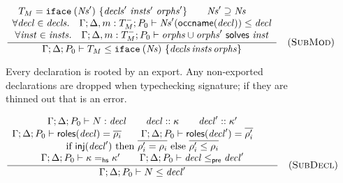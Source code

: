 \begin{figure}


\[
\frac{
\begin{array}{c}
T_M = \texttt{iface}\:(\mathit{Ns}')~\{\mathit{decls}'~\mathit{insts}'~\mathit{orphs}'\} \qquad
\mathit{Ns}' \supseteq \mathit{Ns} \qquad \\
\forall \mathit{decl} \in \mathit{decls}.\quad \Gamma; \Delta, m : T_M^-; P_0 \vdash \mathit{Ns}'(\textsf{occname}(\mathit{decl})) \le \mathit{decl} \\
\forall \mathit{inst} \in \mathit{insts}.\quad \Gamma; \Delta, m : T_M^-; P_0 \vdash \mathit{orphs} \cup \mathit{orphs}' ~\textsf{solves}~ \mathit{inst}
\end{array}
}{
\Gamma; \Delta; P_0 \vdash T_M \le \texttt{iface}\:(\mathit{Ns})~\{\mathit{decls}\, \mathit{insts}\, \mathit{orphs}\}
}
\quad(\textsc{SubMod})
\]

\caption{
Every declaration is rooted by an export.  Any non-exported declarations are dropped when typechecking signature; if they are thinned out that is an error.
}
\label{typing:top-subtyping}


\end{figure}


\begin{figure}


\[
\frac{
\begin{array}{c}
\Gamma; \Delta; P_0 \vdash N : \mathit{decl} \qquad
\mathit{decl} :: \kappa \qquad
\mathit{decl}' :: \kappa' \\
\Gamma; \Delta; P_0 \vdash \textsf{roles}(\mathit{decl}) = \overline{\rho_i} \qquad
\Gamma; \Delta; P_0 \vdash \textsf{roles}(\mathit{decl}') = \overline{\rho'_i} \qquad
\\
\textrm{if}~\textsf{inj}(\mathit{decl}')
    ~\textrm{then}~ \overline{\rho'_i = \rho_i}
    ~\textrm{else}~ \overline{\rho'_i \le \rho_i} \\
\Gamma; \Delta; P_0 \vdash \kappa =_\mathsf{hs} \kappa' \qquad
\Gamma; \Delta; P_0 \vdash \mathit{decl} \le_\textsf{pre} \mathit{decl}'
\end{array}
}{
\Gamma; \Delta; P_0 \vdash N \le \mathit{decl}'
}
\quad(\textsc{SubDecl})
\]
\end{figure}


